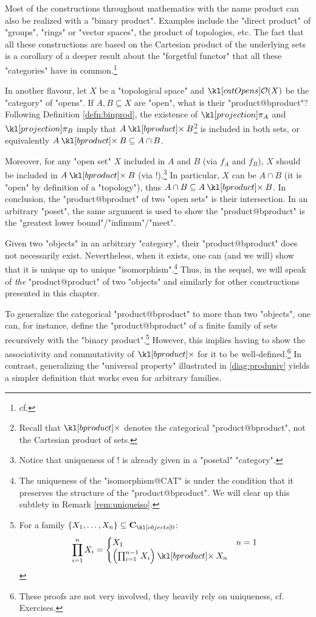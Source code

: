 \documentclass[main.tex]{subfiles}
\begin{document}
\begin{exmps}
    Most of the constructions throughout mathematics with the name product can also be realized with a "binary product". Examples include the "direct product" of "groups", "rings" or "vector spaces", the product of topologies, etc. The fact that all these constructions are based on the Cartesian product of the underlying sets is a corollary of a deeper result about the "forgetful functor" that all these "categories" have in common.\footnote{cf.}%

    In another flavour, let $X$ be a "topological space" and $\catOpens(X)$ be the "category" of "opens". If $A, B \subseteq X$ are "open", what is their "product@bproduct"? Following Definition \ref{defn:binprod}, the existence of $\projection_A$ and $\projection_B$ imply that $A\product B$\footnote{Recall that $\product$ denotes the categorical "product@bproduct", not the Cartesian product of sets.} is included in both sets, or equivalently $A \product B \subseteq A \cap B$.
    
    Moreover, for any "open set" $X$ included in $A$ and $B$ (via $f_A$ and $f_B$), $X$ should be included in $A \product B$ (via $!$).\footnote{Notice that uniqueness of $!$ is already given in a "posetal" "category".} In particular, $X$ can be $A \cap B$ (it is "open" by definition of a "topology"), thus $A \cap B \subseteq A \product B$. In conclusion, the "product@bproduct" of two "open sets" is their intersection. In an arbitrary "poset", the same argument is used to show the "product@bproduct" is the "greatest lower bound"/"infimum"/"meet".
\end{exmps}
\begin{rem}
    Given two "objects" in an arbitrary "category", their "product@bproduct" does not necessarily exist. Nevertheless, when it exists, one can (and we will) show that it is unique up to unique "isomorphism".\footnote{The uniqueness of the "isomorphism@CAT" is under the condition that it preserves the structure of the "product@bproduct". We will clear up this subtlety in Remark \ref{rem:uniqueiso}.} Thus, in the sequel, we will speak of \textit{the} "product@product" of two "objects" and similarly for other constructions presented in this chapter.
\end{rem}
To generalize the categorical "product@bproduct" to more than two "objects", one can, for instance, define the "product@bproduct" of a finite family of sets recursively with the "binary product".\footnote{For a family $\{X_1,\dots, X_n\} \subseteq \obj{\mathbf{C}}$:\begin{align*}
    \prod_{i=1}^n X_i = \begin{cases}
        X_1 &n=1\\
        \left( \prod_{i=1}^{n-1} X_i \right) \product X_n
    \end{cases}
\end{align*}} However, this implies having to show the associativity and commutativity of $\product$ for it to be well-defined.\footnote{These proofs are not very involved, they heavily rely on uniqueness, cf. Exercises.} In contrast, generalizing the "universal property" illustrated in \eqref{diag:produniv} yields a simpler definition that works even for arbitrary families.%
\end{document}
